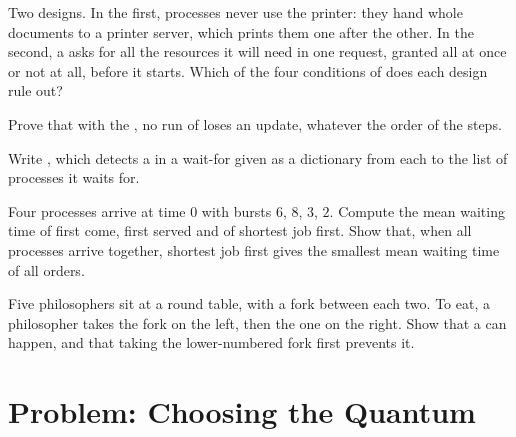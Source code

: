 \begin{exercise}[$\star\star$]\label{exo:g12:processes-and-scheduling:11}
Two designs. In the first, processes never use the printer: they hand whole documents to a printer server, which
prints them one after the other. In the second, a  asks for all the resources it will need in one request,
granted all at once or not at all, before it starts. Which of the four conditions of  does each design rule
out?
\end{exercise}

\begin{exercise}[$\star\star\star$]\label{exo:g12:processes-and-scheduling:12}
Prove that with the , no run of  loses an update, whatever the order of the steps.
\end{exercise}

\begin{exercise}[$\star\star\star$]\label{exo:g12:processes-and-scheduling:13}
Write , which detects a  in a wait-for  given as a dictionary from each
 to the list of processes it waits for.
\end{exercise}

\begin{exercise}[$\star\star\star$]\label{exo:g12:processes-and-scheduling:14}
Four processes arrive at time $0$ with bursts $6$, $8$, $3$, $2$. Compute the mean waiting time of first come, first
served and of shortest job first. Show that, when all processes arrive together, shortest job first gives the smallest
mean waiting time of all orders.
\end{exercise}

\begin{exercise}[$\star\star\star$]\label{exo:g12:processes-and-scheduling:15}
Five philosophers sit at a round table, with a fork between each two. To eat, a philosopher takes the fork on the left,
then the one on the right. Show that a  can happen, and that taking the lower-numbered fork first prevents it.
\end{exercise}

\section{Problem: Choosing the Quantum}\label{sec:g12:processes-and-scheduling:problem}

